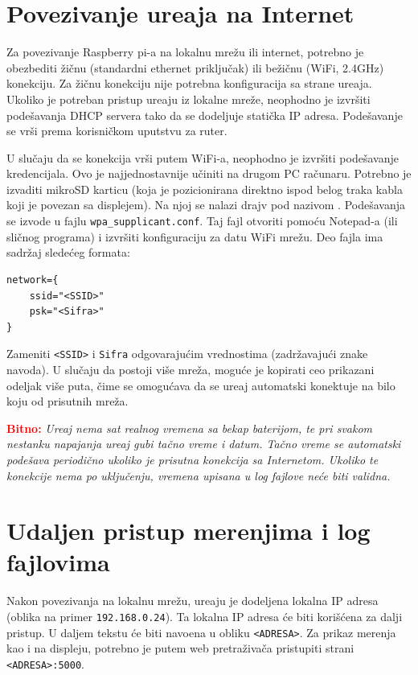\documentclass[a4paper]{article}
\def\bitno#1{\textbf{\textcolor{red}{Bitno:}} \textit{#1}}
\begin{document}
	\section{Povezivanje ure\dj aja na Internet}
	
	Za povezivanje Raspberry pi-a na lokalnu mre\v zu ili internet, potrebno je obezbediti \v zi\v cnu
	(standardni ethernet priklju\v cak) ili be\v zi\v cnu (WiFi, 2.4GHz) konekciju. Za \v zi\v cnu konekciju
	nije potrebna konfiguracija sa strane ure\dj aja. Ukoliko je potreban pristup ure\dj aju iz lokalne 
	mre\v ze, neophodno je izvr\v siti pode\v savanja DHCP servera tako da se dodeljuje stati\v cka IP
	adresa. Pode\v savanje se vr\v si prema korisni\v ckom uputstvu za ruter.
	
	U slu\v caju da se konekcija vr\v si putem WiFi-a, neophodno je izvr\v siti pode\v savanje kredencijala.
	Ovo je najjednostavnije u\v ciniti na drugom PC ra\v cunaru. Potrebno je izvaditi mikroSD karticu
	(koja je pozicionirana direktno ispod belog traka kabla koji je povezan sa displejem). Na njoj se nalazi 
	drajv pod nazivom . Pode\v savanja se izvode u fajlu \texttt{wpa\_supplicant.conf}. 
	Taj fajl otvoriti pomo\' cu Notepad-a (ili sli\v cnog programa) i izvr\v siti konfiguraciju za datu WiFi 
	mre\v zu. Deo fajla ima sadr\v zaj slede\' ceg formata:
	\begin{verbatim}
network={
    ssid="<SSID>"
    psk="<Sifra>"
}
	\end{verbatim}
	Zameniti \texttt{<SSID>} i \texttt{Sifra} odgovaraju\' cim vrednostima (zadr\v zavaju\' ci znake navoda).
	U slu\v caju da postoji vi\v se mre\v za, mogu\' ce je kopirati ceo prikazani odeljak vi\v se puta, \v cime
	se omogu\' cava da se ure\dj aj automatski konektuje na bilo koju od prisutnih mre\v za.
	
	\bitno{Ure\dj aj nema sat realnog vremena sa bekap baterijom, te pri svakom nestanku napajanja
	ure\dj aj gubi ta\v cno vreme i datum. Ta\v cno vreme se automatski pode\v sava periodi\v cno ukoliko je
	prisutna konekcija sa Internetom. Ukoliko te konekcije nema po uklju\v cenju, vremena upisana u log fajlove
	ne\' ce biti validna.}
	
	\section{Udaljen pristup merenjima i log fajlovima}
	
	Nakon povezivanja na lokalnu mre\v zu, ure\dj aju je dodeljena lokalna IP adresa (oblika na primer
	\texttt{192.168.0.24}). Ta lokalna IP adresa \' ce biti kori\v s\' cena za dalji pristup. U daljem tekstu
	\' ce biti navo\dj ena u obliku \texttt{<ADRESA>}. Za prikaz merenja kao i na displeju, potrebno je
	putem web pretra\v ziva\v ca pristupiti strani \texttt{<ADRESA>:5000}. 
	
\end{document}
